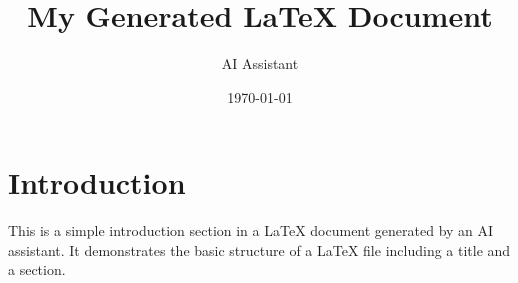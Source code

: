 \documentclass{article}
\title{My Generated LaTeX Document}
\author{AI Assistant}
\date{\today}
\begin{document}
\maketitle

\section{Introduction}
This is a simple introduction section in a LaTeX document generated by an AI assistant. It demonstrates the basic structure of a LaTeX file including a title and a section.
\end{document}
